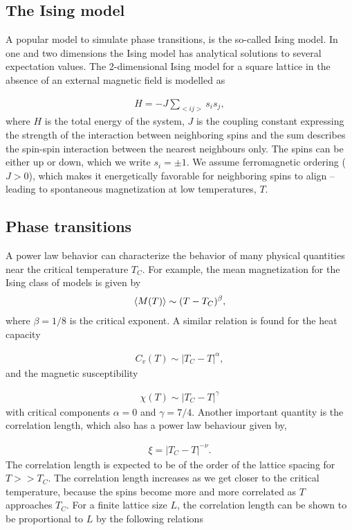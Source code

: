 \documentclass[../main.tex]{subfiles}
\begin{document}
\subsection{The Ising model}
A popular model to simulate phase transitions, is the so-called Ising model. In one and two dimensions the Ising model has analytical solutions to several expectation values. The 2-dimensional Ising model for a square lattice in the absence of an external magnetic field is modelled as 

\begin{align}
    H = -J\sum_{<ij>}s_is_j,
\end{align} where $H$ is the total energy of the system, $J$ is the coupling constant expressing the strength of the interaction between neighboring spins and the sum describes the spin-spin interaction between the nearest neighbours only. The spins can be either up or down, which we write $s_i=\pm1$. We assume ferromagnetic ordering ($J>0$), which makes it energetically favorable for neighboring spins to align -- leading to spontaneous magnetization at low temperatures, $T$.

\subsection{Phase transitions}
A power law behavior can characterize the behavior of many physical quantities near the critical temperature $T_C$. For example, the mean magnetization for the Ising class of models is given by
\begin{align}
    \braket{M(T)}\sim(T-T_C)^\beta,
\end{align} where $\beta=1/8$ is the critical exponent. A similar relation is found for the heat capacity

\begin{align}
    C_v(T)\sim|T_C-T|^\alpha, 
\end{align} and the magnetic susceptibility

\begin{align}
    \chi(T)\sim|T_C-T|^\gamma
\end{align} with critical components $\alpha=0$ and $\gamma=7/4$. Another important quantity is the correlation length, which also has a power law behaviour given by,

\begin{align}
    \xi=|T_C-T|^{-\nu}.
    \label{eq:xi}
\end{align} The correlation length is expected to be of the order of the lattice spacing for $T>>T_C$. The correlation length increases as we get closer to the critical temperature, because the spins become more and more correlated as $T$ approaches $T_C$. For a finite lattice size $L$, the correlation length can be shown to be proportional to $L$ by the following relations
\end{document}
